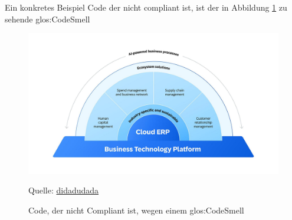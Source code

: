 \documentclass[../main.tex]{subfiles}
\begin{document}
Ein konkretes Beispiel Code der nicht compliant ist, ist der in Abbildung \ref{fig:codecompliance} zu sehende \gls{glos:CodeSmell}

\begin{figure}[ht]
    \centering
    \includegraphics[scale=.21]{"bilder/produktportfolio.jpg"}
    \caption{Code, der nicht Compliant ist, wegen einem \gls{glos:CodeSmell}}
    \footnotesize Quelle: \url{didadudada}
    \label{fig:codecompliance}
\end{figure}
\end{document}
